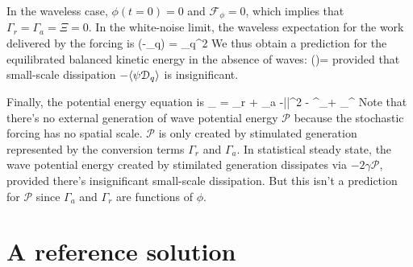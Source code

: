 \documentclass[12pt]{article}
\newcommand{\F}{\mathcal{F}}
\newcommand{\D}{\mathcal{D}}
\newcommand{\phis}{\phi^\star}
\renewcommand{\P}{\mathcal{P}}
\newcommand{\Es}{\mathbb{E}}
\begin{document}
In the waveless case, $\phi(t=0)=0$ and $\F_\phi=0$,  which implies that
$\Gamma_r=\Gamma_a = \Xi = 0$. In the white-noise limit, the waveless expectation for
the work delivered by the forcing is
\beq
\Es\big(-\la\psi\xi_q\ra\big) = \sigma_q^2\per
\eeq
We thus obtain a prediction for the equilibrated balanced kinetic energy in the
absence of waves:
\beq
\label{predicted_K}
\Es(\K )= \com
\eeq
provided that small-scale dissipation $-\la\psi\D_q\ra$ is insignificant.

Finally, the potential energy equation  is
\beq
{} _{ \P} = \Gamma_r + \Gamma_a
 -\gamma \la |\nabla\phi|^2 \ra -  \la \lap\phis\D_\phi + \lap\phi\D_\phis \ra\per
\label{P}
\eeq
Note that there's no external generation of wave potential energy $\P$ because the
stochastic forcing has no spatial scale. $\P$ is only created by stimulated generation represented
by the conversion terms $\Gamma_r$ and $\Gamma_a$. In statistical steady state, the
wave potential energy created by stimilated generation dissipates via $-2\gamma\P$,
 provided there's insignificant small-scale dissipation. But this isn't a prediction
 for $\P$ since $\Gamma_a$ and $\Gamma_r$ are functions of $\phi$.

\section{A reference solution}
\end{document}
